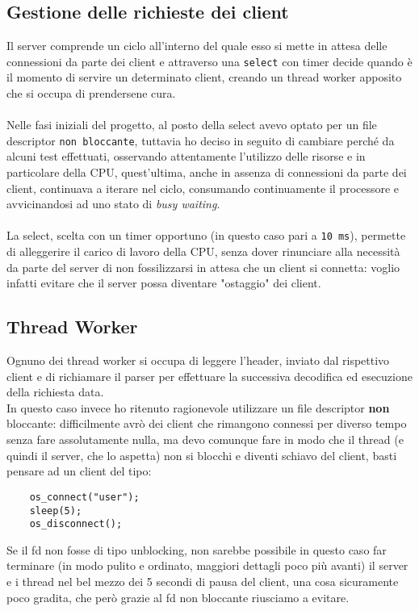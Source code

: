 \subsection{Gestione delle richieste dei client}
\begin{flushleft}
Il server comprende un ciclo all'interno del quale esso si mette in attesa delle connessioni da parte dei client e attraverso una \texttt{select} con timer decide quando è il momento di servire un determinato client, creando un thread worker apposito che si occupa di prendersene cura.
\\~\\
Nelle fasi iniziali del progetto, al posto della select avevo optato per un file descriptor \texttt{non bloccante}, tuttavia ho deciso in seguito di cambiare perché da alcuni test effettuati, osservando attentamente l'utilizzo delle risorse e in particolare della CPU, quest'ultima, anche in assenza di connessioni da parte dei client, continuava a iterare nel ciclo, consumando continuamente il processore e avvicinandosi ad uno stato di \emph{busy waiting}.
\\~\\
La select, scelta con un timer opportuno (in questo caso pari a \texttt{10 ms}), permette di alleggerire il carico di lavoro della CPU, senza dover rinunciare alla necessità da parte del server di non fossilizzarsi in attesa che un client si connetta: voglio infatti evitare che il server possa diventare "ostaggio" dei client.
\end{flushleft}


\vspace{2mm}

\subsection{Thread Worker}
\begin{flushleft}
Ognuno dei thread worker si occupa di leggere l'header, inviato dal rispettivo client e di richiamare il parser per effettuare la successiva decodifica ed esecuzione della richiesta data.\\
In questo caso invece ho ritenuto ragionevole utilizzare un file descriptor \textbf{non} bloccante: difficilmente avrò dei client che rimangono connessi per diverso tempo senza fare assolutamente nulla, ma devo comunque fare in modo che il thread (e quindi il server, che lo aspetta) non si blocchi e diventi schiavo del client, basti pensare ad un client del tipo:

\begin{Verbatim} 
	os_connect("user");
	sleep(5);
	os_disconnect();
\end{Verbatim}

Se il fd non fosse di tipo unblocking, non sarebbe possibile in questo caso far terminare (in modo pulito e ordinato, maggiori dettagli poco più avanti) il server e i thread nel bel mezzo dei 5 secondi di pausa del client, una cosa sicuramente poco gradita, che però grazie al fd non bloccante riusciamo a evitare.

\end{flushleft}

